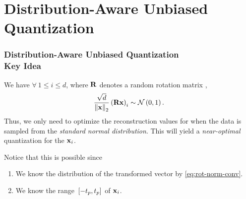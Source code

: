 \documentclass{beamer}
\begin{document}
    \section{Distribution-Aware Unbiased Quantization}
    \begin{frame}
        \frametitle{Distribution-Aware Unbiased Quantization\\\small Key Idea}
        We have \(\forall\ 1 \le i \le d\), where \(\boldsymbol{\mathbf{R}}\) denotes a random
        rotation matrix \cite{vargaftik2021drive},
        \begin{equation}
            \frac{\sqrt{d}}{\left\lVert\boldsymbol{\mathbf{x}}\right\rVert_2}\left(\boldsymbol{\mathbf{Rx}}\right)_i \sim \mathcal N\left(0,1\right).
            \label{eq:rot-norm-conv}
        \end{equation}
        Thus, we only need to optimize the reconstruction values for when the
        data is sampled from the \emph{standard normal distribution}. This will
        yield a \emph{near-optimal} quantization for the \(\boldsymbol{\mathbf{x}}_i\).

        Notice that this is possible since
        \begin{enumerate}
            \item We know the distribution of the transformed vector by
            \eqref{eq:rot-norm-conv}.
            \item We know the range \({}\left[-t_p, t_p\right]\) of \(\boldsymbol{\mathbf{x}}_i\).
        \end{enumerate}
    \end{frame}
    
\end{document}
